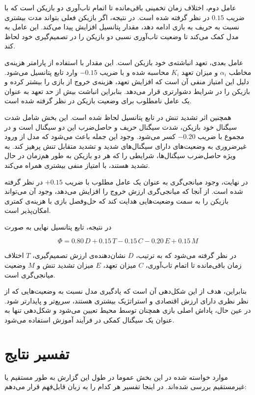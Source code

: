 \documentclass[12pt]{article}
\begin{document}
عامل دوم، اختلاف زمان تخمینی باقی‌مانده تا اتمام تاب‌آوری دو بازیکن
است که با ضریب $0.15$ در نظر گرفته شده است. در نتیجه، اگر بازیکن
فعلی بتواند مدت بیشتری نسبت به حریف به بازی ادامه دهد، مقدار
پتانسیل افزایش پیدا می‌کند. این عامل به مدل کمک می‌کند تا وضعیت
تاب‌آوری نسبی دو بازیکن را در تصمیم‌گیری خود لحاظ کند.

عامل بعدی، تعهد انباشته‌ی خود بازیکن است. این مقدار با استفاده از
پارامتر هزینه‌ی مخاطب $\alpha_i$ و میزان تعهد $K_i$ محاسبه شده و با
ضریب $-0.15$ وارد تابع پتانسیل می‌شود. دلیل این امتیاز منفی آن است
که افزایش تعهد، هزینه‌ی خروج از بازی را بیشتر کرده و بازیکن را در
شرایط دشوارتری قرار می‌دهد. بنابراین انباشت بیش از حد تعهد به عنوان
یک عامل نامطلوب برای وضعیت بازیکن در نظر گرفته شده است.

همچنین اثر تشدید تنش در تابع پتانسیل لحاظ شده است. این بخش شامل
شدت سیگنال خود بازیکن، شدت سیگنال حریف و حاصل‌ضرب این دو سیگنال
است و در مجموع با ضریب $-0.20$ کسر می‌شود. وجود این جمله باعث می‌شود
که مدل از ورود غیرضروری به وضعیت‌های دارای سیگنال‌های شدید و
تشدید متقابل تنش پرهیز کند. به ویژه حاصل‌ضرب سیگنال‌ها، شرایطی را
که هر دو بازیکن به طور هم‌زمان در حال تشدید هستند، با امتیاز
منفی بیشتری همراه می‌کند.

در نهایت، وجود میانجی‌گری به عنوان یک عامل مطلوب با ضریب $+0.15$
در نظر گرفته شده است. از آنجا که میانجی‌گری ارزش خروج را افزایش
می‌دهد، وجود آن می‌تواند بازیکن را به سمت وضعیت‌هایی هدایت کند که
حل‌وفصل بازی با هزینه‌ی کمتری امکان‌پذیر است.

در نتیجه، تابع پتانسیل نهایی به صورت

\[
\Phi
=
0.80\,D
+
0.15\,T
-
0.15\,C
-
0.20\,E
+
0.15\,M
\]

در نظر گرفته می‌شود که به ترتیب، $D$ نشان‌دهنده‌ی ارزش تصمیم‌گیری،
$T$ اختلاف زمان باقی‌مانده تا اتمام تاب‌آوری، $C$ میزان تعهد،
$E$ میزان تشدید تنش و $M$ وضعیت میانجی‌گری است.

بنابراین، هدف از این شکل‌دهی آن است که یادگیری مدل نسبت به
وضعیت‌هایی که از نظر نظری دارای ارزش اقتصادی و استراتژیک بیشتری
هستند، سریع‌تر و پایدارتر شود. در عین حال، پاداش اصلی بازی همچنان
توسط محیط تعیین می‌شود و شکل‌دهی تنها به عنوان یک سیگنال کمکی در
فرآیند آموزش استفاده می‌شود.




\section{تفسیر نتایج}

موارد خواسته شده در این بخش عموما در طول این گزارش به 
طور مستقیم یا غیرمستقیم بررسی شده‌اند. در اینجا تفسیر هر کدام را به زبان قابل‌فهم
قرار می‌دهم:
\end{document}
